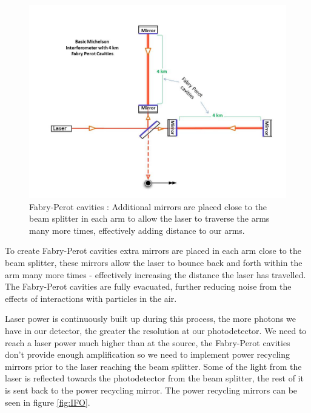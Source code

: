 \begin{figure}
   \includegraphics[width=\textwidth]{images/1_general_relativity/Basic_michelson_with_FP_labeled.jpg}
   \caption{\label{fig:FP_michelson}Fabry-Perot cavities \cite{ligo_ifo}: Additional mirrors are placed close to the beam splitter in each arm to allow the laser to traverse the arms many more times, effectively adding distance to our arms.}
\end{figure}

To create Fabry-Perot cavities extra mirrors are placed in each arm close to the beam splitter, these mirrors allow the laser to bounce back and forth within the arm many more times - effectively increasing the distance the laser has travelled. The Fabry-Perot cavities are fully evacuated, further reducing noise from the effects of interactions with particles in the air.

Laser power is continuously built up during this process, the more photons we have in our detector, the greater the resolution at our photodetector. We need to reach a laser power much higher than at the source, the Fabry-Perot
cavities don't provide enough amplification so we need to implement power recycling mirrors prior to the laser reaching the beam splitter. Some of the light from the laser is reflected towards the photodetector from the beam
splitter, the rest of it is sent back to the power recycling mirror. The power recycling mirrors can be seen in figure \ref{fig:IFO}.

